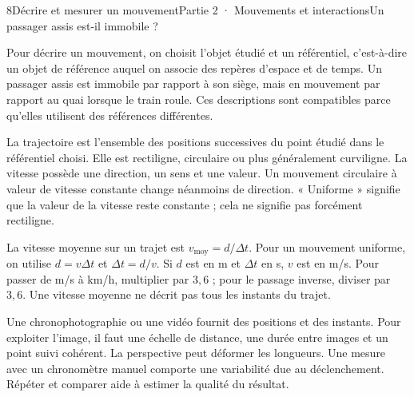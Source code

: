 \begin{ouverture}[college2]{8}{Décrire et mesurer un mouvement}{Partie 2 · Mouvements et interactions}{Un passager assis est-il immobile ?}
\end{ouverture}
\label{ess-8}
Pour décrire un mouvement, on choisit l’objet étudié et un référentiel, c’est-à-dire un objet de référence auquel on associe des repères d’espace et de temps. Un passager assis est immobile par rapport à son siège, mais en mouvement par rapport au quai lorsque le train roule. Ces descriptions sont compatibles parce qu’elles utilisent des références différentes.\par
{}
La trajectoire est l’ensemble des positions successives du point étudié dans le référentiel choisi. Elle est rectiligne, circulaire ou plus généralement curviligne. La vitesse possède une direction, un sens et une valeur. Un mouvement circulaire à valeur de vitesse constante change néanmoins de direction. « Uniforme » signifie que la valeur de la vitesse reste constante ; cela ne signifie pas forcément rectiligne.\par
\clearpage
{}
La vitesse moyenne sur un trajet est $v_{\mathrm{moy}}=d/\Delta t$. Pour un mouvement uniforme, on utilise $d=v\Delta t$ et $\Delta t=d/v$. Si $d$ est en m et $\Delta t$ en s, $v$ est en m/s. Pour passer de m/s à km/h, multiplier par $3{,}6$ ; pour le passage inverse, diviser par $3{,}6$. Une vitesse moyenne ne décrit pas tous les instants du trajet.\par
{}
Une chronophotographie ou une vidéo fournit des positions et des instants. Pour exploiter l’image, il faut une échelle de distance, une durée entre images et un point suivi cohérent. La perspective peut déformer les longueurs. Une mesure avec un chronomètre manuel comporte une variabilité due au déclenchement. Répéter et comparer aide à estimer la qualité du résultat.\par
